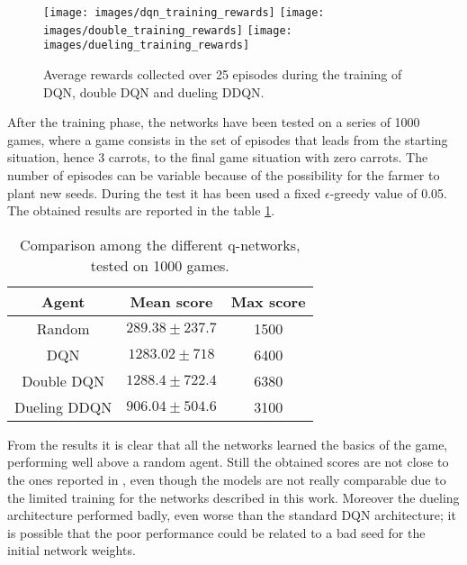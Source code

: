 \documentclass[article,11pt]{article}
\begin{document}
	\begin{figure}
		\texttt{[image: images/dqn\_training\_rewards]}
		\endminipage\hfill
		\texttt{[image: images/double\_training\_rewards]}
		\endminipage\hfill
		\texttt{[image: images/dueling\_training\_rewards]}
		\endminipage
		\caption{Average rewards collected over 25 episodes during the training of DQN, double DQN and dueling DDQN.}
		\label{fig:average_reward}
	\end{figure}


	After the training phase, the networks have been tested on a series of 1000 games, where a game consists in the set of episodes that leads from the starting situation, hence 3 carrots, to the final game situation with zero carrots. The number of episodes can be variable because of the possibility for the farmer to plant new seeds. During the test it has been used a fixed $\epsilon$-greedy value of 0.05.
	The obtained results are reported in the table \ref{tab:test}.
	\begin{table}
		\centering
		\begin{tabular}{|c|c|c|}
			\hline
			Agent	& Mean score & Max score\\
			\hline
			Random & $289.38 \pm 237.7$ & 1500 \\
			DQN & $1283.02 \pm 718$ & 6400\\
			Double DQN & $1288.4 \pm 722.4$ & 6380 \\
			Dueling DDQN & $906.04 \pm 504.6$ & 3100 \\
			\hline
		\end{tabular}
		\caption{Comparison among the different q-networks, tested on 1000 games.}
		\label{tab:test}
	\end{table}

	From the results it is clear that all the networks learned the basics of the game, performing well above a random agent. Still the obtained scores are not close to the ones reported in \cite{combined_dqn}, even though the models are not really comparable due to the limited training for the networks described in this work. Moreover the dueling architecture performed badly, even worse than the standard DQN architecture; it is possible that the poor performance could be related to a bad seed for the initial network weights.
	
\end{document}
